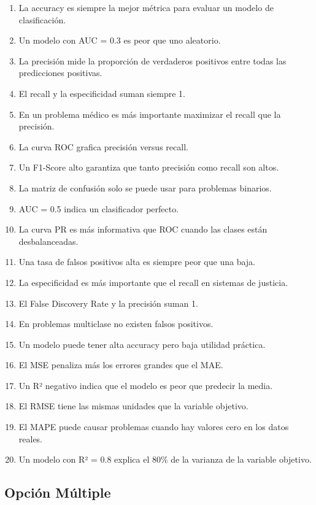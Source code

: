 \documentclass[12pt]{article}
\begin{document}
\begin{enumerate}
    \item La accuracy es siempre la mejor métrica para evaluar un modelo de clasificación.
    \item Un modelo con AUC = 0.3 es peor que uno aleatorio.
    \item La precisión mide la proporción de verdaderos positivos entre todas las predicciones positivas.
    \item El recall y la especificidad suman siempre 1.
    \item En un problema médico es más importante maximizar el recall que la precisión.
    \item La curva ROC grafica precisión versus recall.
    \item Un F1-Score alto garantiza que tanto precisión como recall son altos.
    \item La matriz de confusión solo se puede usar para problemas binarios.
    \item AUC = 0.5 indica un clasificador perfecto.
    \item La curva PR es más informativa que ROC cuando las clases están desbalanceadas.
    \item Una tasa de falsos positivos alta es siempre peor que una baja.
    \item La especificidad es más importante que el recall en sistemas de justicia.
    \item El False Discovery Rate y la precisión suman 1.
    \item En problemas multiclase no existen falsos positivos.
    \item Un modelo puede tener alta accuracy pero baja utilidad práctica.
    \item El MSE penaliza más los errores grandes que el MAE.
    \item Un R² negativo indica que el modelo es peor que predecir la media.
    \item El RMSE tiene las mismas unidades que la variable objetivo.
    \item El MAPE puede causar problemas cuando hay valores cero en los datos reales.
    \item Un modelo con R² = 0.8 explica el 80\% de la varianza de la variable objetivo.
\end{enumerate}

\subsection{Opción Múltiple}
\end{document}
